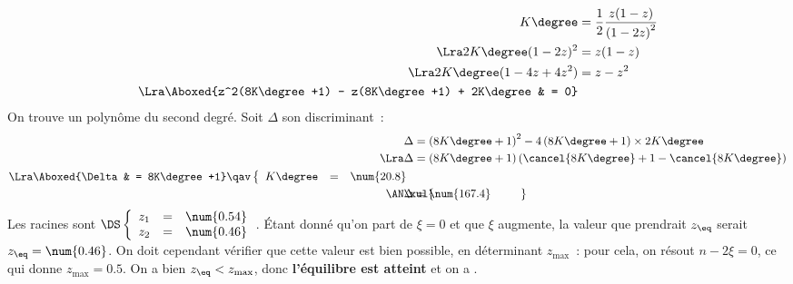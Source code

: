 \documentclass[../../main/main.tex]{subfiles}
\begin{document}
{\begin{align*}
		K\degree                                                & = \frac{1}{2} \frac{z(1-z)}{\left( 1 - 2z \right)^2}
		\\\Lra
		2K\degree(1-2z)^2                                       & = z(1-z)
		\\\Lra
		2K\degree(1-4z + 4z^2)                                  & = z - z^2
		\\\Lra
		\Aboxed{z^2(8K\degree +1) - z(8K\degree +1) + 2K\degree & = 0}
	\end{align*}
	On trouve un polynôme du second degré. Soit $\Delta$ son discriminant~:
	\begin{align*}
		\Delta         & = \left( 8K\degree+1 \right)^{2} -
		4\left(8K\degree+1\right)\times 2K\degree
		\\\Lra
		\Delta         & = \left( 8K\degree+1 \right)\left(
		\cancel{8K\degree}+1-\cancel{8K\degree} \right)
		\\\Lra
		\Aboxed{\Delta & = 8K\degree+1}
		\qav
		\left\{
		\begin{array}{rcl}
			K\degree & = & \num{20.8}
		\end{array}
		\right.                                             \\
		\makebox[0pt][l]{$\phantom{\AN}\xul{\phantom{\Delta = \num{167.4}}}$}
		\AN
		\Delta         & = \num{167.4}
	\end{align*}
	Les racines sont
	$\DS\left\{
		\begin{array}{rcl}
			z_1 & = & \num{0.54} \\
			z_2 & = & \num{0.46}
		\end{array}
		\right.$.
	\bigbreak
	Étant donné qu'on part de $\xi = 0$ et que $\xi$ augmente, la valeur que
	prendrait $z_{\eq}$ serait $z_{\eq} = \num{0.46}$. On doit cependant
	vérifier que cette valeur est bien possible, en déterminant $z_{\max}$~:
	pour cela, on résout $n-2\xi = 0$, ce qui donne $z_{\max} = \num{0.5}$.
	On a bien $z_{\eq} < z_{\max}$, donc \textbf{l'équilibre est atteint} et
	on a .
}
\end{document}
